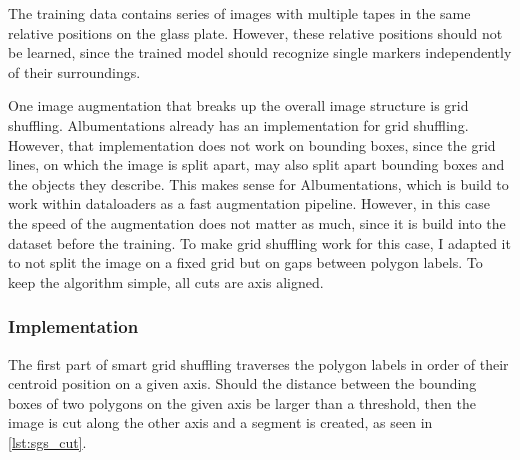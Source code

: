 \documentclass[10pt]{book}
\begin{document}
The training data contains series of images with multiple tapes in the same relative positions on the glass plate. However, these relative positions should not be learned, since the trained model should recognize single markers independently of their surroundings. 

One image augmentation that breaks up the overall image structure is grid shuffling. Albumentations already has an implementation for grid shuffling. However, that implementation does not work on bounding boxes, since the grid lines, on which the image is split apart, may also split apart bounding boxes and the objects they describe. This makes sense for Albumentations, which is build to work within dataloaders as a fast augmentation pipeline. However, in this case the speed of the augmentation does not matter as much, since it is build into the dataset before the training. To make grid shuffling work for this case, I adapted it to not split the image on a fixed grid but on gaps between polygon labels. To keep the algorithm simple, all cuts are axis aligned.

\subsubsection{Implementation}

The first part of smart grid shuffling traverses the polygon labels in order of their centroid position on a given axis. Should the distance between the bounding boxes of two polygons on the given axis be larger than a threshold, then the image is cut along the other axis and a segment is created, as seen in \autoref{lst:sgs_cut}.






\end{document}
